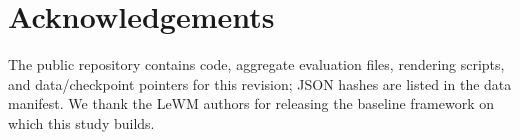 \section*{Acknowledgements}
The public repository contains code, aggregate evaluation files, rendering scripts, and data/checkpoint pointers for this revision; JSON hashes are listed in the data manifest. We thank the LeWM authors for releasing the baseline framework on which this study builds.
